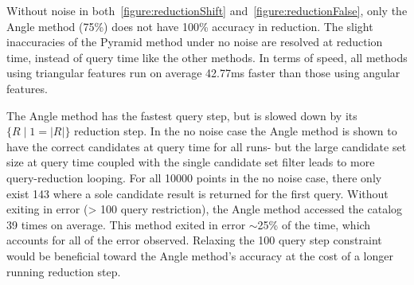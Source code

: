 \begin{figure}
\end{figure}

Without noise in both~\autoref{figure:reductionShift} and~\autoref{figure:reductionFalse}, only the Angle method
(75\%) does not have 100\% accuracy in reduction.
The slight inaccuracies of the Pyramid method under no noise are resolved at reduction time, instead of query time
like the other methods.
In terms of speed, all methods using triangular features run on average 42.77ms faster than those using angular
features.

The Angle method has the fastest query step, but is slowed down by its $\{ R \mid 1 = |R|\}$ reduction step.
In the no noise case the Angle method is shown to have the correct candidates at query time for all runs- but
the large candidate set size at query time coupled with the single candidate set filter leads to more query-reduction
looping.
For all 10000 points in the no noise case, there only exist 143 where a sole candidate result is returned for the
first query.
Without exiting in error (> 100 query restriction), the Angle method accessed the catalog 39 times on average.
This method exited in error $\sim$25\% of the time, which accounts for all of the error observed.
Relaxing the 100 query step constraint would be beneficial toward the Angle method's accuracy at the cost of
a longer running reduction step.


